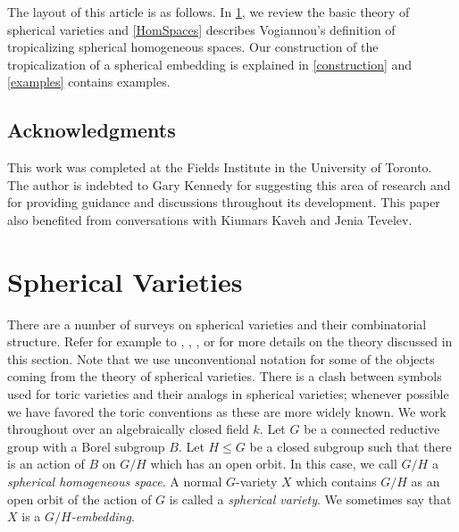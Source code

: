 \documentclass[12pt,twoside,cd]{amsart}
\theoremstyle{definition}
\begin{document}
The layout of this article is as follows. In \textsection \ref{sphvar}, we review the basic theory of spherical varieties and \textsection \ref{HomSpaces} describes Vogiannou's definition of tropicalizing spherical homogeneous spaces.
Our construction of the tropicalization of a spherical embedding is explained in \textsection\ref{construction} and \textsection\ref{examples} contains examples.

\subsection*{Acknowledgments} This work was completed at the Fields Institute in the University of Toronto. The author is indebted to Gary Kennedy for suggesting this area of research and for providing guidance and discussions throughout its development. This paper also benefited from conversations with Kiumars Kaveh and Jenia Tevelev.

\section{Spherical Varieties}\label{sphvar}

There are a number of surveys on spherical varieties and their combinatorial structure.
Refer for example to \cite{LV}, \cite{Kn}, \cite{Pas}, or \cite{Pe} for more details on the theory discussed in this section.
Note that we use unconventional notation for some of the objects coming from the theory of spherical varieties.
There is a clash between symbols used for toric varieties and their analogs in spherical varieties; whenever possible we have favored the toric conventions as these are more widely known.
We work throughout over an algebraically closed field $k$.
Let $G$ be a connected reductive group with a Borel subgroup $B$. Let $H \leq G$ be a closed subgroup such that there is an action of $B$ on $G/H$ which has an open orbit.
In this case, we call $G/H$ a \emph{spherical homogeneous space}.
A normal $G$-variety $X$ which contains $G/H$ as an open orbit of the action of $G$ is called a \emph{spherical variety}. We sometimes say that $X$ is a \emph{$G/H$-embedding}.
\end{document}
